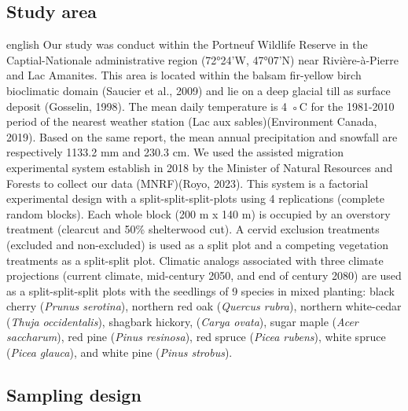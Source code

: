 \subsection*{Study area}
\label{subsec:area}

\begin{otherlanguage*}{english}
  Our study was conduct within the Portneuf Wildlife Reserve in the Captial-Nationale administrative region (72°24'W, 47°07'N) near Rivière-à-Pierre and Lac Amanites. 
  This area is located within the balsam fir-yellow birch bioclimatic domain (Saucier et al., 2009) and lie on a deep glacial till as surface deposit (Gosselin, 1998).
  The mean daily temperature is 4 ◦C for the 1981-2010 period of the nearest weather station (Lac aux sables)(Environment Canada, 2019). 
  Based on the same report, the mean annual precipitation and snowfall are respectively 1133.2 mm and 230.3 cm.
  We used the assisted migration experimental system establish in 2018 by the Minister of Natural Resources and Forests to collect our data (MNRF)(Royo, 2023).
  This system is a factorial experimental design with a split-split-split-plots using 4 replications (complete random blocks). 
  Each whole block (200 m x 140 m) is occupied by an overstory treatment (clearcut and 50\% shelterwood cut). 
  A cervid exclusion treatments (excluded and non-excluded) is used as a split plot and a competing vegetation treatments as a split-split plot. 
  Climatic analogs associated with three climate projections (current climate, mid-century 2050, and end of century 2080) 
  are used as a split-split-split plots with the seedlings of 9 species in mixed planting: black cherry (\textit{Prunus serotina}), northern red oak (\textit{Quercus rubra}), 
  northern white-cedar (\textit{Thuja occidentalis}), shagbark hickory, (\textit{Carya ovata}), sugar maple (\textit{Acer saccharum}), red pine (\textit{Pinus resinosa}), 
  red spruce (\textit{Picea rubens}), white spruce (\textit{Picea glauca}), and white pine (\textit{Pinus strobus}).

\end{otherlanguage*}


\subsection*{Sampling design}
\label{subsec:sampling}

